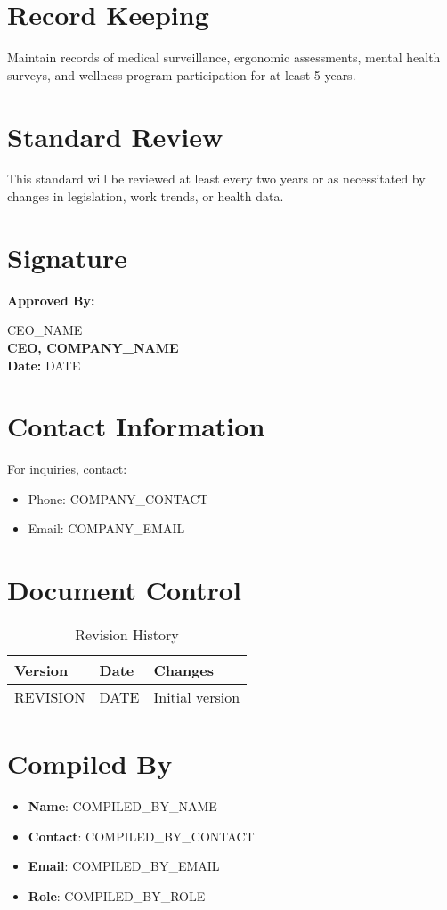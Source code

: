 \documentclass[12pt]{article}
\begin{document}
\section{Record Keeping}
Maintain records of medical surveillance, ergonomic assessments, mental health surveys, and wellness program participation for at least 5 years.

\section{Standard Review}
This standard will be reviewed at least every two years or as necessitated by changes in legislation, work trends, or health data.

\section{Signature}
\textbf{Approved By:}

{{CEO_NAME}}\\
\textbf{CEO, {{COMPANY_NAME}}}\\
\textbf{Date:} {{DATE}}

\section{Contact Information}
For inquiries, contact:
\begin{itemize}
    \item Phone: {{COMPANY_CONTACT}}
    \item Email: {{COMPANY_EMAIL}}
\end{itemize}

\section{Document Control}
\begin{table}[h]
    \centering
    \begin{tabular}{p{3cm}p{3cm}p{6cm}}
        \toprule
        \textbf{Version} & \textbf{Date} & \textbf{Changes} \\
        \midrule
        {{REVISION}} & {{DATE}} & Initial version \\
        \bottomrule
    \end{tabular}
    \caption{Revision History}
\end{table}

\section{Compiled By}
\begin{itemize}
    \item \textbf{Name}: {{COMPILED_BY_NAME}}
    \item \textbf{Contact}: {{COMPILED_BY_CONTACT}}
    \item \textbf{Email}: {{COMPILED_BY_EMAIL}}
    \item \textbf{Role}: {{COMPILED_BY_ROLE}}
\end{itemize}
\end{document}
